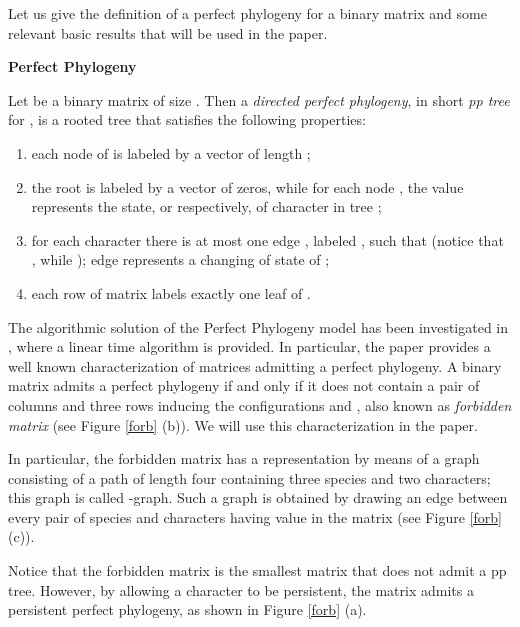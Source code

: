 \documentclass{llncs}
\begin{document}
 \label{pre1}
 
  
Let us give the definition  of a perfect phylogeny for a binary matrix  and  some relevant basic results that will be used in the paper.
 
 
 \noindent
 {\bf Perfect Phylogeny}
 
 Let   be a binary matrix of size . Then a {\it directed
perfect phylogeny}, in short  {\em  pp tree} for , is a rooted tree 
that satisfies the following properties:

\begin{enumerate}
 
 \item each node  of  is labeled by a vector  of length ;
 
 \item  the root is labeled  by a vector of zeros, while for each  node , the value 
  represents  the state,   or  respectively, of character  in tree ;

\item  for each character  there is at most one edge , labeled , such that
 (notice that , while );
edge  represents a changing of state of ; 

\item each row of matrix  labels exactly one leaf of .

\end{enumerate}
 
The algorithmic solution of the Perfect Phylogeny model has been investigated in \cite{Gus91}, where a linear time algorithm is provided. 
In particular, the paper \cite{Gus91} provides a well known characterization of matrices admitting a perfect phylogeny.
A binary matrix  admits a perfect phylogeny if and only if it does not contain a pair of columns and three rows inducing    the configurations  and ,  also known as   {\em forbidden matrix} (see Figure \ref{forb} (b)). We will use this  characterization  in the paper.

In particular, the forbidden matrix has a representation by means of a  graph consisting of a path of length four containing three species and two characters; this graph  is   called -graph. Such a graph is obtained by drawing an edge between every pair of  species and  characters having value  in the matrix (see Figure \ref{forb} (c)). 

Notice that the forbidden matrix is the smallest matrix that does not admit a pp tree. However, by allowing a character to be persistent, the matrix admits a persistent perfect phylogeny, as shown in Figure \ref{forb} (a).
\end{document}
